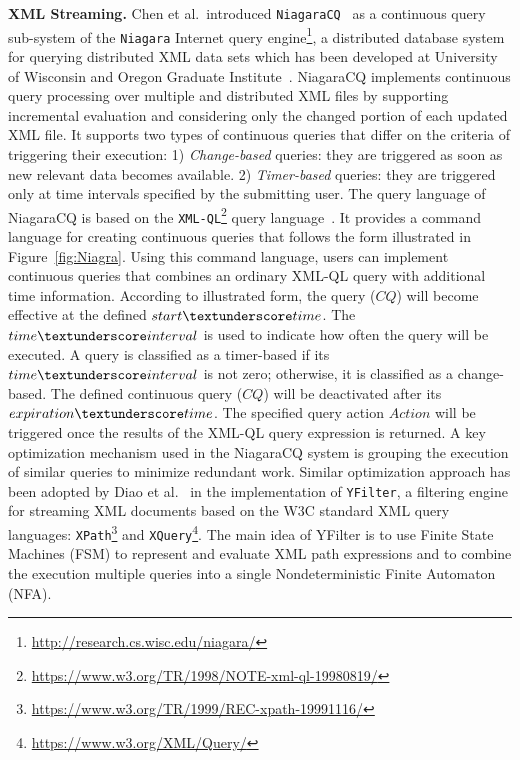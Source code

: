 \textbf{XML Streaming.}
Chen et al.\ introduced  \texttt{NiagaraCQ}~\cite{chen_et_al_2000} as a continuous query sub-system of the \texttt{Niagara}
Internet query engine\footnote{\url{http://research.cs.wisc.edu/niagara/}},  a distributed database system for querying distributed XML data sets which has been developed at University of Wisconsin and Oregon Graduate Institute~\cite{naughton2001niagara}. NiagaraCQ implements continuous query processing over multiple and distributed XML files by supporting incremental evaluation and considering only the changed portion of each updated XML file. It supports two types of continuous queries that differ on the criteria of triggering their execution:
1) \emph{Change-based}  queries: they are triggered as soon as new relevant data becomes available. 2) \emph{Timer-based}  queries: they are triggered only at time intervals specified by the submitting user. The query language of NiagaraCQ is based on the \texttt{XML-QL}\footnote{\url{https://www.w3.org/TR/1998/NOTE-xml-ql-19980819/}} query language~\cite{deutsch1999query}.
It provides a command language for creating continuous queries that follows the  form illustrated in Figure~\ref{fig:Niagra}. Using this command language, users can implement continuous queries that combines an ordinary XML-QL query with additional time information.
According to illustrated form, the query ($CQ$) will become effective at the defined $start\textunderscore time$. The
$time\textunderscore interval$ is used to indicate how often the query will be executed. A
query is classified as a timer-based if its $time\textunderscore interval$ is not zero; otherwise, it
is classified as a change-based. 
The defined continuous query ($CQ$) will be deactivated after its $expiration\textunderscore time$. The specified query action $Action$ will be triggered once the results of the XML-QL query expression is returned.  A key optimization mechanism used  in the NiagaraCQ system is grouping the execution of similar queries to minimize redundant work.  Similar optimization approach has been adopted by Diao et al.~\cite{diao_et_al_2002} in the implementation of  \texttt{YFilter}, a filtering engine for streaming XML documents based on the W3C standard XML query languages: \texttt{XPath}\footnote{\url{https://www.w3.org/TR/1999/REC-xpath-19991116/}} and \texttt{XQuery}\footnote{\url{https://www.w3.org/XML/Query/}}. The main idea of YFilter is to use Finite State Machines (FSM)  to represent and evaluate XML path expressions and to combine the execution multiple queries into a single Nondeterministic Finite Automaton (NFA). 
